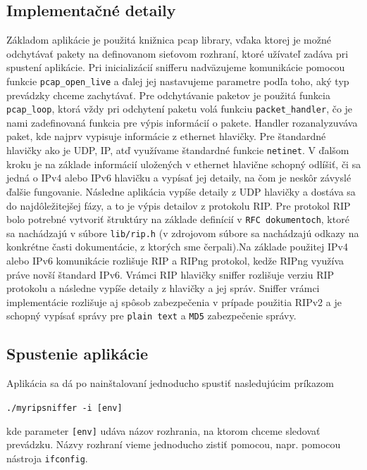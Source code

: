 \documentclass{report}
\begin{document}
    \subsection{Implementačné detaily}
    Základom aplikácie je použitá knižnica pcap library, vďaka ktorej je možné odchytávať pakety na definovanom sieťovom rozhraní, ktoré užívateľ zadáva pri spustení aplikácie. Pri inicializácií snifferu nadväzujeme komunikácie pomocou funkcie \verb|pcap_open_live| a ďalej jej nastavujeme parametre podľa toho, aký typ prevádzky chceme zachytávať. Pre odchytávanie paketov je použitá funkcia \verb|pcap_loop|, ktorá vždy pri odchytení paketu volá funkciu \verb|packet_handler|, čo je nami zadefinovaná funkcia pre výpis informácií o pakete. Handler rozanalyzuváva paket, kde najprv vypisuje informácie z ethernet hlavičky. Pre štandardné hlavičky ako je UDP, IP, atď využívame štandardné funkcie \verb|netinet|. V ďalšom kroku je na základe informácií uložených v ethernet hlavične schopný odlíšiť, či sa jedná o IPv4 alebo IPv6 hlavičku a vypísať jej detaily, na čom je neskôr závyslé ďalšie fungovanie. Následne aplikácia vypíše detaily z UDP hlavičky a dostáva sa do najdôležitejšej fázy, a to je výpis detailov z protokolu RIP. Pre protokol RIP bolo potrebné vytvoriť štruktúry na základe definícií v \verb|RFC dokumentoch|, ktoré sa nachádzajú v súbore \verb|lib/rip.h| (v zdrojovom súbore sa nachádzajú odkazy na konkrétne časti dokumentácie, z ktorých sme čerpali).Na základe použitej IPv4 alebo IPv6 komunikácie rozlišuje RIP a RIPng protokol, kedže RIPng využíva práve novší štandard IPv6. Vrámci RIP hlavičky sniffer rozlišuje verziu RIP protokolu a následne vypíše detaily z hlavičky a jej správ. Sniffer vrámci implementácie rozlišuje aj spôsob zabezpečenia v prípade použitia RIPv2 a je schopný vypísať správy pre \verb|plain text| a \verb|MD5| zabezpečenie správy.
    
    \subsection{Spustenie aplikácie}
    Aplikácia sa dá po nainštalovaní jednoducho spustiť nasledujúcim príkazom
    
    \verb|./myripsniffer -i [env]|
    
    kde parameter \verb|[env]| udáva názov rozhrania, na ktorom chceme sledovať prevádzku. Názvy rozhraní vieme jednoducho zistiť pomocou, napr. pomocou nástroja \verb|ifconfig|.
    
    \newpage
    
\end{document}

